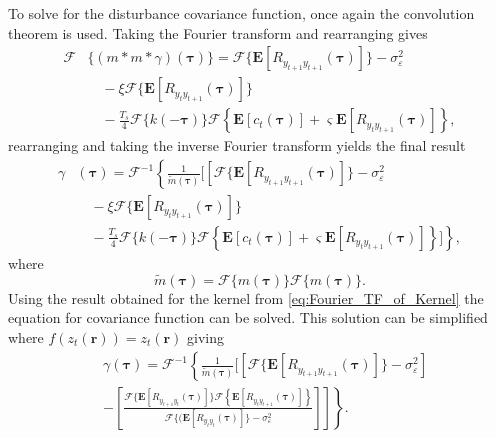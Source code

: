 \documentclass[10pt,twocolumn,twoside]{IEEEtran}
\begin{document}
To solve for the disturbance covariance function, once again the convolution theorem is used. Taking the Fourier transform and rearranging gives
\begin{align}
	\mathcal{F}&\{(m\ast m \ast \gamma)(\boldsymbol\tau)\} = \mathcal{F}\{\mathbf{E}[R_{y_{t+1}y_{t+1}}(\boldsymbol{\tau})]\}-\sigma_{\varepsilon}^2 \nonumber \\ 
	&\quad-\xi \mathcal{F}\{\mathbf{E}[R_{y_ty_{t+1}}(\boldsymbol{\tau})]\} \nonumber \\
	&\quad - \frac{T_s}{4} \mathcal{F}\{k(-\boldsymbol\tau)\}\mathcal{F}\left\{\mathbf{E}\left[c_t(\boldsymbol\tau)\right] + \varsigma \mathbf{E}\left[R_{y_ty_{t+1}}(\boldsymbol\tau)\right] \right\},
\end{align}
 rearranging and taking the inverse Fourier transform yields the final result 
 \begin{align}\label{eq:EM-MMGFourier2}   
	\gamma&(\boldsymbol\tau) =\mathcal{F}^{-1}\left\lbrace\frac{1}{\tilde{m}(\boldsymbol\tau)}\Bigg[\left[ \mathcal{F}\{\mathbf{E}[R_{y_{t+1}y_{t+1}}(\boldsymbol{\tau})]\}-\sigma_{\varepsilon}^2  \nonumber \right. \right. \\ 
	&\quad-\xi \mathcal{F}\{\mathbf{E}[R_{y_ty_{t+1}}(\boldsymbol{\tau})]\} \nonumber \\
	&\left.\quad - \frac{T_s}{4} \mathcal{F}\{k(-\boldsymbol\tau)\}\mathcal{F}\left\{\mathbf{E}\left[c_t(\boldsymbol\tau)\right] + \varsigma \mathbf{E}\left[R_{y_ty_{t+1}}(\boldsymbol\tau)\right] \right\}\Bigg]\right\rbrace,
\end{align}
where
\begin{equation}
 \tilde{m}(\boldsymbol\tau)=\mathcal{F}\{m(\boldsymbol\tau)\}\mathcal{F}\{m(\boldsymbol\tau)\}.
\end{equation}
Using the result obtained for the kernel from  \eqref{eq:Fourier_TF_of_Kernel}  the equation for covariance function can be solved.  This solution can be simplified where $f(z_t(\mathbf{r}))=z_t(\mathbf{r})$ giving
\begin{align}\label{eq:DiffusionDisturbanceSolution}
	&\gamma(\boldsymbol\tau) =\mathcal{F}^{-1}\left\lbrace \frac{1}{\tilde{m}(\boldsymbol\tau)}\Bigg[\left[\mathcal{F}\{\mathbf{E}[R_{y_{t+1}y_{t+1}}(\boldsymbol{\tau})]\}-\sigma_{\varepsilon}^2\right] \nonumber \right.\\
 &\left. \left.- \left[\frac{\mathcal{F}\{\mathbf{E}[R_{y_{t+1}y_t}(\boldsymbol{\tau})]\}\mathcal{F}\left\{\mathbf{E}\left[R_{y_ty_{t+1}}(\boldsymbol\tau)\right] \right\}}{\mathcal{F}\{(\mathbf{E}\left[R_{y_ty_t}(\boldsymbol\tau)\right]\} - \sigma_{\varepsilon}^2}\right]\right]\right\rbrace.
\end{align}
\end{document}
